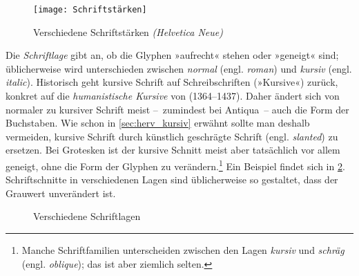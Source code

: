 \begin{figure}
  \centering
  \texttt{[image: Schriftstärken]}
  \caption{Verschiedene Schriftstärken \emph{(Helvetica Neue)}}
  \label{fig:Schriftstärken}
\end{figure}

Die \emph{Schriftlage} gibt an, ob die Glyphen »aufrecht« stehen oder
»geneigt« sind; üblicherweise wird unterschieden zwischen
\emph{normal} (engl. \emph{\foreignlanguage{british}{roman}}) und
\emph{kursiv} (engl. \emph{\foreignlanguage{british}{italic}}).
Historisch geht kursive Schrift auf Schreibschriften (»Kursive«)
zurück, konkret auf die \emph{humanistische Kursive} von  (1364--1437).  Daher ändert sich von normaler zu
kursiver Schrift meist --~zumindest bei Antiqua~-- auch die Form der
Buchstaben.  Wie schon in \cref{sec:herv_kursiv} erwähnt sollte man
deshalb vermeiden, kursive Schrift durch künstlich geschrägte Schrift
(engl. \emph{\foreignlanguage{british}{slanted}}) zu ersetzen.  Bei
Grotesken ist der kursive Schnitt meist aber tatsächlich vor allem
geneigt, ohne die Form der Glyphen zu verändern.\footnote{Manche
  Schriftfamilien unterscheiden zwischen den Lagen \emph{kursiv} und
  \emph{schräg} (engl. \emph{\foreignlanguage{british}{oblique}}); das
  ist aber ziemlich selten.}  Ein Beispiel findet sich in
\cref{fig:Schriftlagen}.  Schriftschnitte in verschiedenen Lagen sind
üblicherweise so gestaltet, dass der Grauwert unverändert ist.

\begin{figure}
  \centering

  \hspace{.1\textwidth}

  \caption{Verschiedene Schriftlagen}
  \label{fig:Schriftlagen}
\end{figure}

